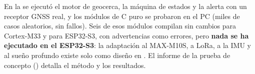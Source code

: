 En la \pBoard{} se ejecutó el motor de geocerca, la máquina de estados y la alerta con un receptor GNSS
real, y los módulos de C puro se probaron en el PC (miles de casos aleatorios, sin fallos). Seis de esos
módulos compilan sin cambios para Cortex-M33 y para ESP32-S3, con advertencias como errores, pero
\textbf{nada se ha ejecutado en el ESP32-S3}: la adaptación al MAX-M10S, a LoRa, a la IMU y al sueño
profundo existe solo como diseño en . El informe de la prueba de concepto
() detalla el método y los resultados.
